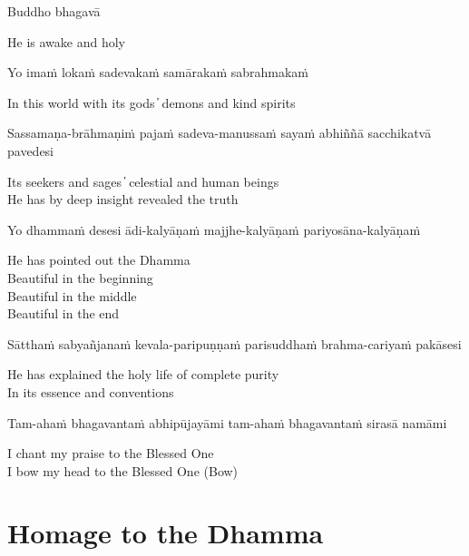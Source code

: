 Buddho bhagavā

\begin{cprenglish}
  He is awake and holy
\end{cprenglish}

Yo imaṁ lokaṁ sadevakaṁ samārakaṁ sabrahmakaṁ

\begin{cprenglish}
  In this world with its gods ̓ demons and kind spirits
\end{cprenglish}

Sassamaṇa-brāhmaṇiṁ pajaṁ sadeva-manussaṁ sayaṁ abhiññā sacchikatvā pavedesi

\begin{cprenglish}
  Its seekers and sages  ̓  celestial and human beings\\
  He has by deep insight revealed the truth
\end{cprenglish}

Yo dhammaṁ desesi ādi-kalyāṇaṁ majjhe-kalyāṇaṁ pariyosāna-kalyāṇaṁ

\begin{cprenglish}
  He has pointed out the Dhamma\\
  Beautiful in the beginning\\
  Beautiful in the middle\\
  Beautiful in the end\\
\end{cprenglish}

Sātthaṁ sabyañjanaṁ kevala-paripuṇṇaṁ parisuddhaṁ brahma-cariyaṁ pakāsesi

\begin{cprenglish}
  He has explained the holy life of complete purity\\
  In its essence and conventions
\end{cprenglish}

Tam-ahaṁ bhagavantaṁ abhipūjayāmi tam-ahaṁ bhagavantaṁ sirasā namāmi
\begin{cprenglish}
  I chant my praise to the Blessed One\\
  I bow my head to the Blessed One (Bow)
\end{cprenglish}

\section{Homage to the Dhamma}

\begin{leader}
\end{leader}
\begin{leader}
\end{leader}

